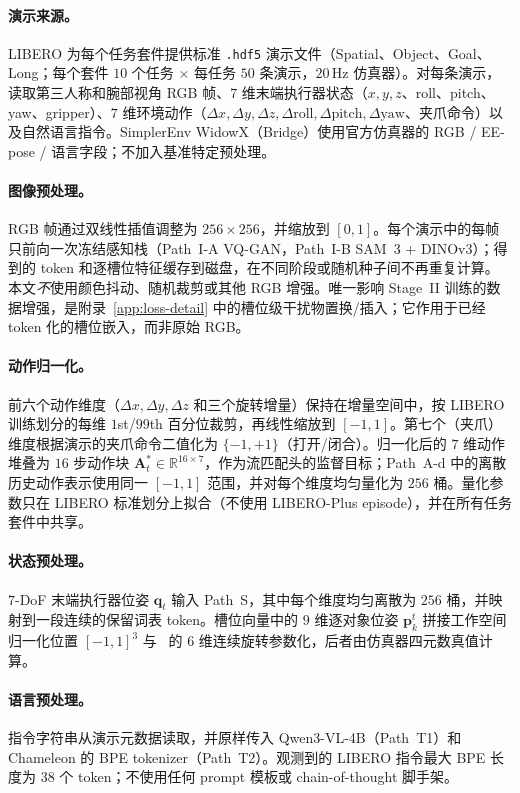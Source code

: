 \paragraph{演示来源。}
LIBERO 为每个任务套件提供标准 \texttt{.hdf5} 演示文件（Spatial、Object、Goal、Long；每个套件 $10$ 个任务 $\times$ 每任务 $50$ 条演示，$20$\,Hz 仿真器）。对每条演示，读取第三人称和腕部视角 RGB 帧、$7$ 维末端执行器状态（$x,y,z$、roll、pitch、yaw、gripper）、$7$ 维环境动作（$\Delta x,\Delta y,\Delta z,\Delta\text{roll},\Delta\text{pitch},\Delta\text{yaw}$、夹爪命令）以及自然语言指令。SimplerEnv WidowX（Bridge）使用官方仿真器的 RGB / EE-pose / 语言字段；不加入基准特定预处理。

\paragraph{图像预处理。}
RGB 帧通过双线性插值调整为 $256\!\times\!256$，并缩放到 $[0,1]$。每个演示中的每帧只前向一次冻结感知栈（Path~I-A VQ-GAN，Path~I-B SAM~3 + DINOv3）；得到的 token 和逐槽位特征缓存到磁盘，在不同阶段或随机种子间不再重复计算。本文\emph{不}使用颜色抖动、随机裁剪或其他 RGB 增强。唯一影响 Stage~II 训练的数据增强，是附录~\ref{app:loss-detail} 中的槽位级干扰物置换/插入；它作用于已经 token 化的槽位嵌入，而非原始 RGB。

\paragraph{动作归一化。}
前六个动作维度（$\Delta x,\Delta y,\Delta z$ 和三个旋转增量）保持在增量空间中，按 LIBERO 训练划分的每维 $1$st/$99$th 百分位裁剪，再线性缩放到 $[-1,1]$。第七个（夹爪）维度根据演示的夹爪命令二值化为 $\{-1,+1\}$（打开/闭合）。归一化后的 $7$ 维动作堆叠为 $16$ 步动作块 $\mathbf{A}_t^{*}\!\in\!\mathbb{R}^{16\times 7}$，作为流匹配头的监督目标；Path~A-d 中的离散历史动作表示使用同一 $[-1,1]$ 范围，并对每个维度均匀量化为 $256$ 桶。量化参数只在 LIBERO 标准划分上拟合（不使用 LIBERO-Plus episode），并在所有任务套件中共享。

\paragraph{状态预处理。}
$7$-DoF 末端执行器位姿 $\mathbf{q}_t$ 输入 Path~S，其中每个维度均匀离散为 $256$ 桶，并映射到一段连续的保留词表 token。槽位向量中的 $9$ 维逐对象位姿 $\mathbf{p}_k^t$ 拼接工作空间归一化位置 $[-1,1]^3$ 与~\citep{zhou2019continuity} 的 $6$ 维连续旋转参数化，后者由仿真器四元数真值计算。

\paragraph{语言预处理。}
指令字符串从演示元数据读取，并原样传入 Qwen3-VL-4B（Path~T1）和 Chameleon 的 BPE tokenizer（Path~T2）。观测到的 LIBERO 指令最大 BPE 长度为 $38$ 个 token；不使用任何 prompt 模板或 chain-of-thought 脚手架。


